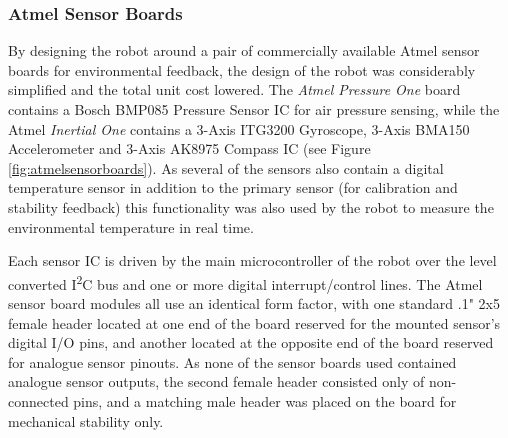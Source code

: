 \FloatBarrier
\subsubsection{Atmel Sensor Boards}

By designing the robot around a pair of commercially available Atmel sensor boards for environmental feedback, the design of the robot was considerably simplified and the total unit cost lowered. The \textit{Atmel Pressure One} board contains a Bosch BMP085 Pressure Sensor IC for air pressure sensing, while the Atmel \textit{Inertial One} contains a 3-Axis ITG3200 Gyroscope, 3-Axis BMA150 Accelerometer and 3-Axis AK8975 Compass IC (see Figure \ref{fig:atmelsensorboards}). As several of the sensors also contain a digital temperature sensor in addition to the primary sensor (for calibration and stability feedback) this functionality was also used by the robot to measure the environmental temperature in real time.

Each sensor IC is driven by the main microcontroller of the robot over the level converted I\textsuperscript{2}C bus and one or more digital interrupt/control lines. The Atmel sensor board modules all use an identical form factor, with one standard .1" 2x5 female header located at one end of the board reserved for the mounted sensor's digital I/O pins, and another located at the opposite end of the board reserved for analogue sensor pinouts. As none of the sensor boards used contained analogue sensor outputs, the second female header consisted only of non-connected pins, and a matching male header was placed on the board for mechanical stability only.

